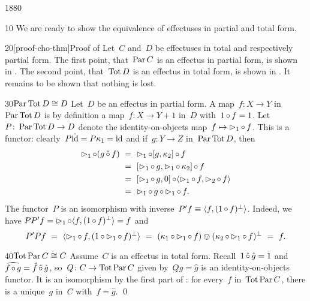 \begin{parsec}{1880}%
\begin{point}{10}%
We are ready to show the equivalence of effectuses in partial and total form.
\begin{point}{20}[proof-cho-thm]{Proof of }%
Let~$C$ and~$D$ be effectuses in total and respectively partial form.
The first point, that~$\operatorname{Par} C$ is an effectus in partial form,
    is shown in .
The second point, that~$\operatorname{Tot} D$ is an effectus in total form,
    is shown in .
It remains to be shown that nothing is lost.
\begin{point}{30}{$\operatorname{Par} \operatorname{Tot} D \cong D$}%
Let~$D$ be an effectus in partial form.
A map~$f\colon X \to Y$ in~$\operatorname{Par} \operatorname{Tot} D$
    is by definition a map~$f\colon X \to Y+1$
        in~$D$ with~$1 \mathop{\circ} f= 1$.
Let~$P \colon \operatorname{Par} \operatorname{Tot} D \to D$
    denote the identity-on-objects map~$f \mapsto \mathord{\vartriangleright}_1 \mathop{\circ} f$.
This is a functor: clearly~$P\hat{\mathrm{id}} = P\kappa_1 = \mathrm{id} $ and
    if~$g\colon Y \to Z$ in~$\operatorname{Par}\operatorname{Tot} D$, then
\begin{align*}
    \pproj_1 \after (g \hafter f) & \ = \ 
    \pproj_1 \after [g, \kappa_2] \after f \\
    & \ = \ [\pproj_1 \after g, \pproj_1 \after \kappa_2] \after f \\
    & \ = \ [\pproj_1 \after g,  0] \after 
                \langle \pproj_1 \after f, \pproj_2 \after f\rangle \\
                & \ = \ \pproj_1 \after g  \after \pproj_1 \after f.
\end{align*}
The functor~$P$ is an isomorphism with inverse~$P' f \equiv \langle f, (1 \mathop{\circ} f)^\perp\rangle$.
Indeed, we have
    $P P' f = \mathord{\vartriangleright}_1 \mathop{\circ} \langle f, (1 \mathop{\circ} f)^\perp \rangle = f $
and
\begin{equation*}
    P' P f  \ =\  \langle \pproj_1 \after f, (1 \after \pproj_1 \after f)^\perp\rangle \ =\  (\kappa_1 \after \pproj_1 \after f) \ovee (\kappa_2 \after \pproj_1 \after f)^\perp\ =\  f.
\end{equation*}
\spacingfix{}
\begin{point}{40}{$\operatorname{Tot} \operatorname{Par} C \cong C$}%
Assume~$C$ is an effectus in total form.
Recall~$1 \mathop{\hat\circ} \hat{g} = 1$
and~$\smash{\widehat{f \mathop{\circ} g}} = \hat{f} \mathop{\hat\circ} \hat{g}$,
    so~$Q\colon C \to \operatorname{Tot} \operatorname{Par} C$
    given by~$Q g = \hat{g}$ is an identity-on-objects functor.
It is an isomorphism by the first part of :
    for every~$f$ in~$\operatorname{Tot} \operatorname{Par} C$,
    there is a unique~$g$ in~$C$
    with~$f = \hat{g}$. \qed
\end{point}
\end{point}
\end{point}
\end{point}
\end{parsec}

